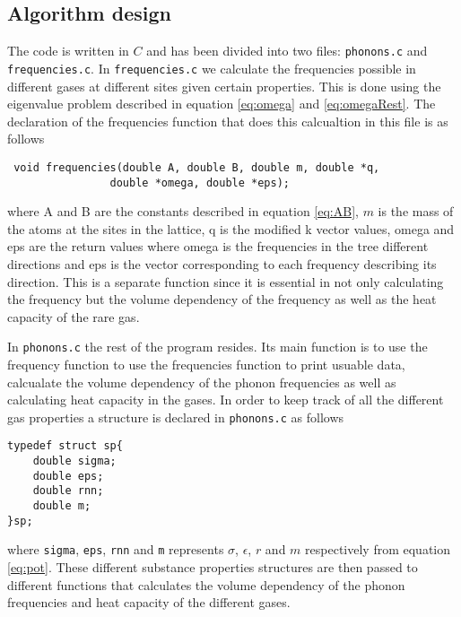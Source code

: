 \documentclass[11pt]{article}
\begin{document}
\subsection{Algorithm design}
The code is written in $C$ and has been divided into two files: \verb+phonons.c+ and \verb+frequencies.c+. In \verb+frequencies.c+ we calculate the frequencies possible in different gases at different sites given certain properties. This is done using the eigenvalue problem described in equation \ref{eq:omega} and \ref{eq:omegaRest}. The declaration of the frequencies function that does this calcualtion in this file is as follows
\begin{lstlisting}
 void frequencies(double A, double B, double m, double *q, 
				double *omega, double *eps);
\end{lstlisting}
where A and B are the constants described in equation \ref{eq:AB}, $m$ is the mass of the atoms at the sites in the lattice, q is the modified k vector values, omega and eps are the return values where omega is the frequencies in the tree different directions and eps is the vector corresponding to each frequency describing its direction. This is a separate function since it is essential in not only calculating the frequency but the volume dependency of the frequency as well as the heat capacity of the rare gas. 

In \verb+phonons.c+ the rest of the program resides. Its main function is to use the frequency function to use the frequencies function to print usuable data, calcualate the volume dependency of the phonon frequencies as well as calculating heat capacity in the gases. In order to keep track of all the different gas properties a structure is declared in \verb+phonons.c+ as follows
\begin{lstlisting}
typedef struct sp{
	double sigma;
	double eps;
	double rnn;
	double m;
}sp;
\end{lstlisting}
where \verb+sigma+, \verb+eps+, \verb+rnn+ and \verb+m+ represents $\sigma$, $\epsilon$, $r$ and $m$ respectively from equation \ref{eq:pot}. These different substance properties structures are then passed to different functions that calculates the volume dependency of the phonon frequencies and heat capacity of the different gases.
\end{document}
